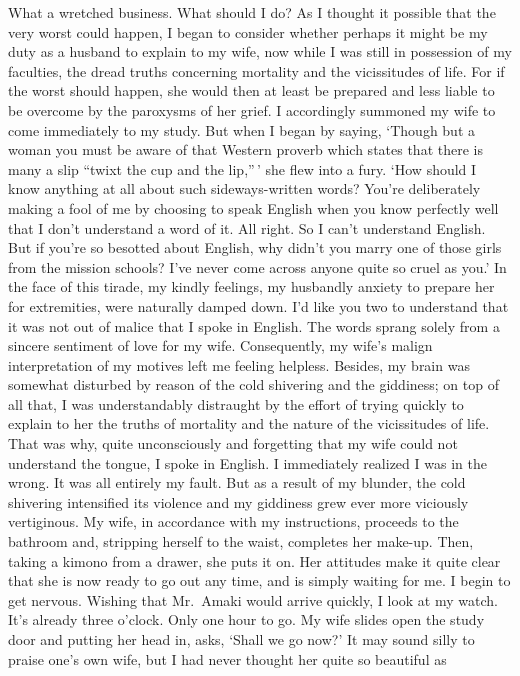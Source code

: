 \documentclass[12pt, openright]{book}
\begin{document}
What a wretched business. What should I do? As I thought it possible
that the very worst could happen, I began to consider whether perhaps it
might be my duty as a husband to explain to my wife, now while I was
still in possession of my faculties, the dread truths concerning
mortality and the vicissitudes of life. For if the worst should happen,
she would then at least be prepared and less liable to be overcome by
the paroxysms of her grief. I accordingly summoned my wife to come
immediately to my study. But when I began by saying, `Though but a woman
you must be aware of that Western proverb which states that there is
many a slip ``twixt the cup and the lip,''\,' she flew into a fury. `How
should I know anything at all about such sideways-written words? You're
deliberately making a fool of me by choosing to speak English when you
know perfectly well that I don't understand a word of it. All right. So
I can't understand English. But if you're so besotted about English, why
didn't you marry one of those girls from the mission schools? I've never
come across anyone quite so cruel as you.' In the face of this tirade,
my kindly feelings, my husbandly anxiety to prepare her for extremities,
were naturally damped down. I'd like you two to understand that it was
not out of malice that I spoke in English. The words sprang solely from
a sincere sentiment of love for my wife. Consequently, my wife's malign
interpretation of my motives left me feeling helpless. Besides, my brain
was somewhat disturbed by reason of the cold shivering and the
giddiness; on top of all that, I was understandably distraught by the
effort of trying quickly to explain to her the truths of mortality and
the nature of the vicissitudes of life. That was why, quite
unconsciously and forgetting that my wife could not understand the
tongue, I spoke in English. I immediately realized I was in the wrong.
It was all entirely my fault. But as a result of my blunder, the cold
shivering intensified its violence and my giddiness grew ever more
viciously vertiginous. My wife, in accordance with my instructions,
proceeds to the bathroom and, stripping herself to the waist, completes
her make-up. Then, taking a kimono from a drawer, she puts it on. Her
attitudes make it quite clear that she is now ready to go out any time,
and is simply waiting for me. I begin to get nervous. Wishing that
Mr.~Amaki would arrive quickly, I look at my watch. It's already three
o'clock. Only one hour to go. My wife slides open the study door and
putting her head in, asks, `Shall we go now?' It may sound silly to
praise one's own wife, but I had never thought her quite so beautiful as
\end{document}
